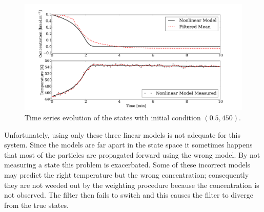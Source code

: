 \documentclass[../masters.tex]{subfiles}
\begin{document}
\begin{figure}[H] 
\centering
\includegraphics[scale=0.3]{skf_s3_t.pdf}
\caption{Time series evolution of the states with initial condition $(0.5, 450)$.}
\label{fig_3mod_t}
\end{figure}
Unfortunately, using only these three linear models is not adequate for this system. Since the models are far apart in the state space it sometimes happens that most of the particles are propagated forward using the wrong model. By not measuring a state this problem is exacerbated. Some of these incorrect models may predict the right temperature but the wrong concentration; consequently they are not weeded out by the weighting procedure because the concentration is not observed. The filter then fails to switch and this causes the filter to diverge from the true states. 
\end{document}
